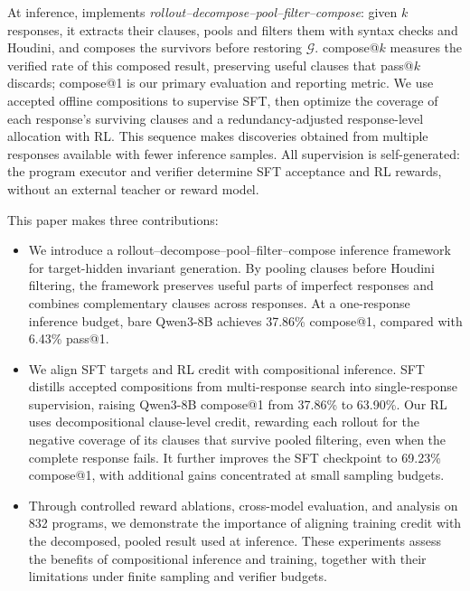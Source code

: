 At inference, \sam{} implements
\emph{rollout--decompose--pool--filter--compose}: given \(k\) responses, it
extracts their clauses, pools and filters them with syntax checks and Houdini,
and composes the survivors before restoring \(\mathcal G\).  compose@\(k\)
measures the verified rate of this composed result, preserving useful clauses
that pass@\(k\) discards; compose@1 is our primary evaluation and reporting
metric.  We use accepted offline compositions to supervise SFT, then optimize
the coverage of each response's surviving clauses and a redundancy-adjusted
response-level allocation with RL.  This
sequence makes discoveries obtained from multiple responses available with
fewer inference samples.  All supervision is self-generated: the program
executor and verifier determine SFT acceptance and RL rewards, without an
external teacher or reward model.



\begin{samepage}
This paper makes three contributions:
\begin{itemize}
  \item We introduce a rollout--decompose--pool--filter--compose inference
  framework for target-hidden invariant generation.  By pooling clauses
  before Houdini filtering, the framework preserves useful parts of imperfect
  responses and combines complementary clauses across responses.  At a
  one-response inference budget, bare Qwen3-8B achieves 37.86\% compose@1,
  compared with 6.43\% pass@1.
  \item We align SFT targets and RL credit with compositional inference.
  SFT distills accepted compositions from multi-response search into
  single-response supervision, raising Qwen3-8B compose@1 from 37.86\% to
  63.90\%.  Our RL uses decompositional clause-level credit, rewarding
  each rollout for the negative coverage of its clauses that survive pooled
  filtering, even when the complete response fails.  It further improves the
  SFT checkpoint to 69.23\% compose@1, with additional gains concentrated at
  small sampling budgets.
  \item Through controlled reward ablations, cross-model evaluation, and
  analysis on 832 programs, we demonstrate the importance of aligning
  training credit with the decomposed, pooled result used at inference.
  These experiments assess the benefits of compositional inference and
  training, together with their limitations under finite sampling and
  verifier budgets.
\end{itemize}
\end{samepage}
